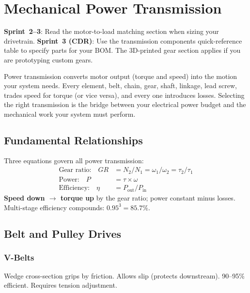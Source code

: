 \chapter{Mechanical Power Transmission}\label{ch:transmission}

\begin{tipbox}
\textbf{Sprint~2--3}: Read the motor-to-load matching section when sizing your drivetrain. \textbf{Sprint~3 (CDR)}: Use the transmission components quick-reference table to specify parts for your BOM. The 3D-printed gear section applies if you are prototyping custom gears.
\end{tipbox}


\vspace{1em}

Power transmission converts motor output (torque and speed) into the motion your system needs. Every element, belt, chain, gear, shaft, linkage, lead screw, trades speed for torque (or vice versa), and every one introduces losses. Selecting the right transmission is the bridge between your electrical power budget and the mechanical work your system must perform.

\vspace{1em}

\section{Fundamental Relationships}
Three equations govern all power transmission:
\begin{align}
\text{Gear ratio:} \quad GR &= N_2/N_1 = \omega_1/\omega_2 = \tau_2/\tau_1 \\
\text{Power:} \quad P &= \tau \times \omega \\
\text{Efficiency:} \quad \eta &= P_{\text{out}}/P_{\text{in}}
\end{align}
\textbf{Speed down $\to$ torque up} by the gear ratio; power constant minus losses. Multi-stage efficiency compounds: $0.95^3 = 85.7\%$.

\section{Belt and Pulley Drives}
\subsection{V-Belts}
Wedge cross-section grips by friction. Allows slip (protects downstream). 90--95\% efficient. Requires tension adjustment.

